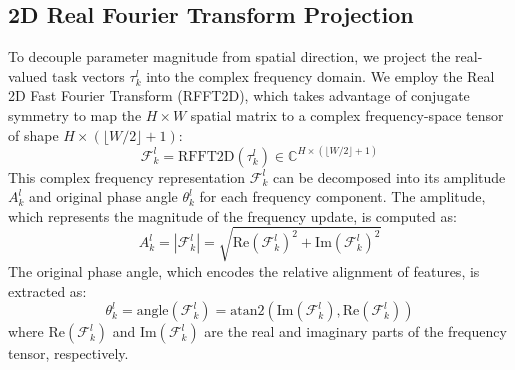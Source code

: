 \subsection{2D Real Fourier Transform Projection}
To decouple parameter magnitude from spatial direction, we project the real-valued task vectors $\tau_k^l$ into the complex frequency domain. We employ the Real 2D Fast Fourier Transform (RFFT2D), which takes advantage of conjugate symmetry to map the $H \times W$ spatial matrix to a complex frequency-space tensor of shape $H \times (\lfloor W/2 \rfloor + 1)$:
\begin{equation}
    \mathcal{F}_k^l = \text{RFFT2D}(\tau_k^l) \in \mathbb{C}^{H \times (\lfloor W/2 \rfloor + 1)}
\end{equation}
This complex frequency representation $\mathcal{F}_k^l$ can be decomposed into its amplitude $A_k^l$ and original phase angle $\theta_k^l$ for each frequency component. The amplitude, which represents the magnitude of the frequency update, is computed as:
\begin{equation}
    A_k^l = |\mathcal{F}_k^l| = \sqrt{\text{Re}(\mathcal{F}_k^l)^2 + \text{Im}(\mathcal{F}_k^l)^2}
\end{equation}
The original phase angle, which encodes the relative alignment of features, is extracted as:
\begin{equation}
    \theta_k^l = \text{angle}(\mathcal{F}_k^l) = \text{atan2}\left(\text{Im}(\mathcal{F}_k^l), \text{Re}(\mathcal{F}_k^l)\right)
\end{equation}
where $\text{Re}(\mathcal{F}_k^l)$ and $\text{Im}(\mathcal{F}_k^l)$ are the real and imaginary parts of the frequency tensor, respectively.

